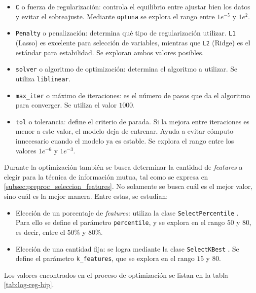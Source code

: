 \begin{itemize}
    \item \texttt{C} o fuerza de regularización: controla el equilibrio entre ajustar bien los datos y evitar el sobreajuste. Mediante \texttt{optuna} se explora el rango entre $1e^{-5}$ y $1e^2$.
    \item \texttt{Penalty} o penalización: determina qué tipo de regularización utilizar. \texttt{L1} (Lasso) es excelente para selección de variables, mientras que \texttt{L2} (Ridge) es el estándar para estabilidad. Se exploran ambos valores posibles.
    \item \texttt{solver} o algoritmo de optimización: determina el algoritmo a utilizar. Se utiliza \texttt{liblinear}.
    \item \texttt{max\_iter} o máximo de iteraciones: es el número de pasos que da el algoritmo para converger. Se utiliza el valor $1000$.
    \item \texttt{tol} o tolerancia: define el criterio de parada. Si la mejora entre iteraciones es menor a este valor, el modelo deja de entrenar. Ayuda a evitar cómputo innecesario cuando el modelo ya es estable. Se explora el rango entre los valores $1e^{-6}$ y $1e^{-3}$.
\end{itemize}

Durante la optimización también se busca determinar la cantidad de \textit{features} a elegir para la técnica de información mutua, tal como se expresa en \ref{subsec:preproc_seleccion_features}. No solamente se busca cuál es el mejor valor, sino cuál es la mejor manera. Entre estas, se estudian:

\begin{itemize}
    \item Elección de un porcentaje de \textit{features}: utiliza la clase \texttt{SelectPercentile} \citep{WEBSITE:sklearn_SelectPercentile}. Para ello se define el parámetro \texttt{percentile}, y se explora en el rango $50$ y $80$, es decir, entre el 50\% y 80\%.
    \item Elección de una cantidad fija: se logra mediante la clase \texttt{SelectKBest} \citep{WEBSITE:sklearn_SelectKBest}. Se define el parámetro \texttt{k\_features}, que se explora en el rango $15$ y $80$.
\end{itemize}

Los valores encontrados en el proceso de optimización se listan en la tabla \ref{tab:log-reg-hip}.

